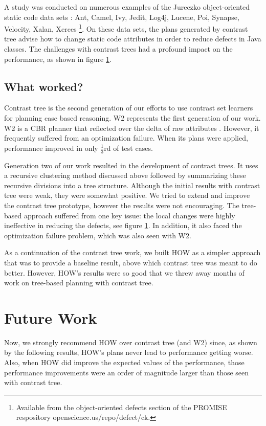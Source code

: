 \documentclass[conference]{IEEEtran}
\begin{document}
	A study was conducted on numerous examples of the Jureczko object-oriented static code data sets \cite{}: Ant, Camel, Ivy, Jedit, Log4j, Lucene, Poi, Synapse, Velocity, Xalan, Xerces \footnote{Available from the object-oriented defects section of the PROMISE respository openscience.us/repo/defect/ck.}. On these data sets, the plans generated by contrast tree advise
	how to change static code attributes in order to reduce defects in Java classes. The challenges with contrast trees had a profound impact on the performance, as shown in figure \ref{}.
	\subsection{What worked?}
	Contrast tree is the second generation of our efforts to use contrast set learners for planning case based reasoning. W2 represents the first generation of our work. W2 is a CBR planner that reflected over the delta of raw attributes \cite{}. However, it frequently suffered from an optimization failure. When its plans were applied, performance improved in only  $\tfrac{1}{3}$rd of test cases. 
	
	Generation two of our work resulted in the development of contrast trees. It uses a recursive clustering method discussed above followed by summarizing these recursive divisions into a tree structure. Although the initial results with contrast tree were weak, they were somewhat positive. We tried to extend and improve the contrast tree prototype, however the results were not encouraging. The tree-based approach suffered from one key issue: the local changes were highly ineffective in reducing the defects, see figure \ref{}. In addition, it also faced the optimization failure problem, which was also seen with W2. 
	
	As a continuation of the contrast tree work, we built HOW as a simpler approach that was to provide a baseline result, above which contrast tree was meant to do better. However, HOW’s results were so good that we threw away months of work on tree-based planning with contrast tree. 
	\section{Future Work}
	Now, we strongly recommend HOW over contrast tree (and W2) since, as shown by the following results, HOW’s plans never lead to performance getting worse. Also, when HOW did improve the expected values of the performance, those performance improvements were an order of magnitude larger than those seen with contrast tree. 
\end{document}
